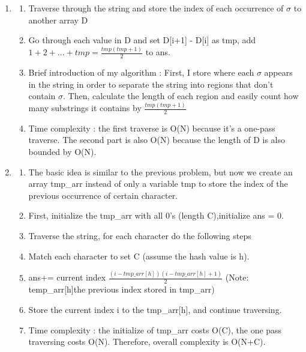 \documentclass{article}
\begin{document}
\begin{CJK*}{UTF8}{bsmi}
\begin{enumerate}
        
    \item  \begin{enumerate}
        \item Traverse through the string and store the index of each occurrence of $\sigma$ to another array D
        \item Go through each value in D and set D[i+1] - D[i] as tmp, add $1+2+...+tmp = \frac{tmp(tmp+1)}{2}$ to ans.
        \item Brief introduction of my algorithm : First, I store where each $\sigma$ appears in the string in order to separate the string into regions that don't contain $\sigma$. Then, calculate the length of each region and easily count how many substrings it contains by $\frac{tmp(tmp+1)}{2}$
        \item Time complexity : the first traverse is O(N) because it's a one-pass traverse. The second part is also O(N) because the length of D is also bounded by O(N).
    \end{enumerate}

    
    \item \begin{enumerate}
        \item The basic idea is similar to the previous problem, but now we create an array tmp\_arr instead of only a variable tmp to store the index of the previous occurrence of certain character.
        \item First, initialize the tmp\_arr with all 0's (length C),initialize ans = 0.
        \item Traverse the string, for each character do the following steps 
        \item Match each character to set C (assume the hash value is h).
        \item  ans+= current index $\frac{(i- tmp\_arr[h]) (i- tmp\_arr[h]+1)}{2}$ (Note: temp\_arr[h]the previous index stored in tmp\_arr) 
        \item Store the current index i to the tmp\_arr[h], and continue traversing.
        \item Time complexity : the initialize of tmp\_arr costs O(C), the one pass traversing costs O(N). Therefore, overall complexity is O(N+C).
    \end{enumerate} 
     
    
\end{enumerate}


\end{CJK*}
\end{document}
